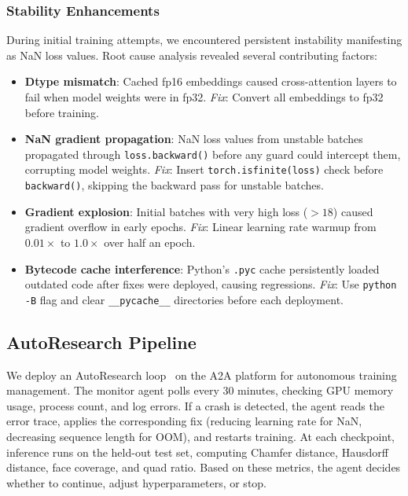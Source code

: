 \documentclass[conference]{IEEEtran}
\begin{document}
\subsubsection{Stability Enhancements}

During initial training attempts, we encountered persistent instability manifesting as NaN loss values.
Root cause analysis revealed several contributing factors:

\begin{itemize}
\item \textbf{Dtype mismatch}: Cached fp16 embeddings caused cross-attention layers to fail when model weights were in fp32. \textit{Fix}: Convert all embeddings to fp32 before training.
\item \textbf{NaN gradient propagation}: NaN loss values from unstable batches propagated through \texttt{loss.backward()} before any guard could intercept them, corrupting model weights. \textit{Fix}: Insert \texttt{torch.isfinite(loss)} check before \texttt{backward()}, skipping the backward pass for unstable batches.
\item \textbf{Gradient explosion}: Initial batches with very high loss ($>18$) caused gradient overflow in early epochs. \textit{Fix}: Linear learning rate warmup from $0.01\times$ to $1.0\times$ over half an epoch.
\item \textbf{Bytecode cache interference}: Python's \texttt{.pyc} cache persistently loaded outdated code after fixes were deployed, causing regressions. \textit{Fix}: Use \texttt{python -B} flag and clear \texttt{\_\_pycache\_\_} directories before each deployment.
\end{itemize}

\subsection{AutoResearch Pipeline}

We deploy an AutoResearch loop~\cite{karpathy2026autoresearch} on the A2A platform for autonomous training management.
The monitor agent polls every 30 minutes, checking GPU memory usage, process count, and log errors.
If a crash is detected, the agent reads the error trace, applies the corresponding fix (reducing learning rate for NaN, decreasing sequence length for OOM), and restarts training.
At each checkpoint, inference runs on the held-out test set, computing Chamfer distance, Hausdorff distance, face coverage, and quad ratio.
Based on these metrics, the agent decides whether to continue, adjust hyperparameters, or stop.
\end{document}
